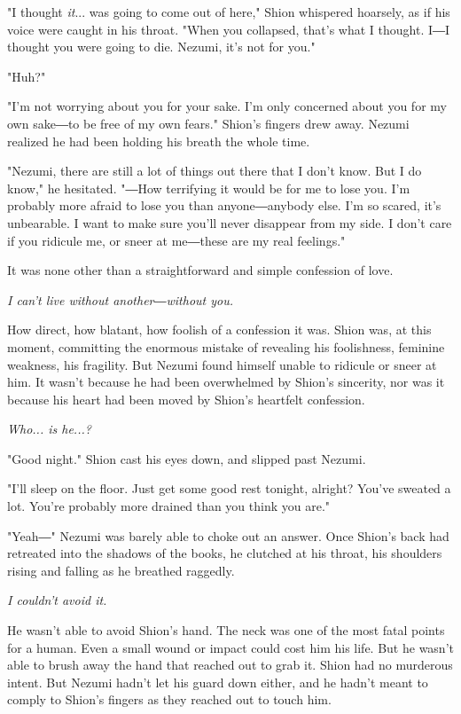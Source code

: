 "I thought \emph{it}... was going to come out of here," Shion whispered
hoarsely, as if his voice were caught in his throat. "When you
collapsed, that's what I thought. I―I thought you were going to die.
Nezumi, it's not for you."

"Huh?"

"I'm not worrying about you for your sake. I'm only concerned about you
for my own sake―to be free of my own fears." Shion's fingers drew away.
Nezumi realized he had been holding his breath the whole time.

"Nezumi, there are still a lot of things out there that I don't know.
But I do know," he hesitated. "―How terrifying it would be for me to
lose you. I'm probably more afraid to lose you than anyone―anybody else.
I'm so scared, it's unbearable. I want to make sure you'll never
disappear from my side. I don't care if you ridicule me, or sneer at
me―these are my real feelings."

It was none other than a straightforward and simple confession of love.

\emph{I can't live without another―without you.}

How direct, how blatant, how foolish of a confession it was. Shion was,
at this moment, committing the enormous mistake of revealing his
foolishness, feminine weakness, his fragility. But Nezumi found himself
unable to ridicule or sneer at him. It wasn't because he had been
overwhelmed by Shion's sincerity, nor was it because his heart had been
moved by Shion's heartfelt confession.

\emph{Who... is he...?}

"Good night." Shion cast his eyes down, and slipped past Nezumi.

"I'll sleep on the floor. Just get some good rest tonight, alright?
You've sweated a lot. You're probably more drained than you think you
are."

"Yeah―" Nezumi was barely able to choke out an answer. Once Shion's back
had retreated into the shadows of the books, he clutched at his throat,
his shoulders rising and falling as he breathed raggedly.

\emph{I couldn't avoid it.}

He wasn't able to avoid Shion's hand. The neck was one of the most fatal
points for a human. Even a small wound or impact could cost him his
life. But he wasn't able to brush away the hand that reached out to grab
it. Shion had no murderous intent. But Nezumi hadn't let his guard down
either, and he hadn't meant to comply to Shion's fingers as they reached
out to touch him.


